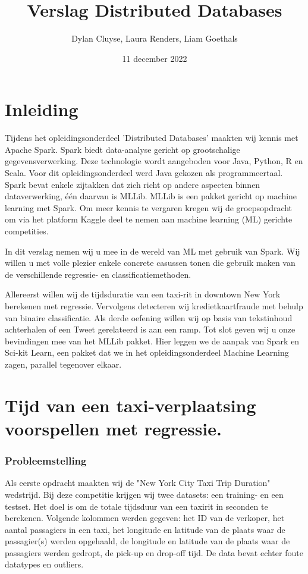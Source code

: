 \documentclass[a4paper,10pt,twoside]{report}
\title{Verslag Distributed Databases}
\author{Dylan {Cluyse}, Laura {Renders}, Liam {Goethals}}
\date{11 december 2022}
\begin{document}
\maketitle

\tableofcontents

\chapter{Inleiding}

Tijdens het opleidingsonderdeel 'Distributed Databases' maakten wij kennis met Apache Spark. Spark biedt data-analyse gericht op grootschalige gegevensverwerking. Deze technologie wordt aangeboden voor Java, Python, R en Scala. Voor dit opleidingsonderdeel werd Java gekozen als programmeertaal. Spark bevat enkele zijtakken dat zich richt op andere aspecten binnen dataverwerking, één daarvan is MLLib. MLLib is een pakket gericht op machine learning met Spark. Om meer kennis te vergaren kregen wij de groepsopdracht om via het platform Kaggle deel te nemen aan machine learning (ML) gerichte competities.

In dit verslag nemen wij u mee in de wereld van ML met gebruik van Spark. Wij willen u met volle plezier enkele concrete casussen tonen die gebruik maken van de verschillende regressie- en classificatiemethoden.

Allereerst willen wij de tijdsduratie van een taxi-rit in downtown New York berekenen met regressie. Vervolgens detecteren wij kredietkaartfraude met behulp van binaire classificatie. Als derde oefening willen wij op basis van tekstinhoud achterhalen of een Tweet gerelateerd is aan een ramp. Tot slot geven wij u onze bevindingen mee van het MLLib pakket. Hier leggen we de aanpak van Spark en Sci-kit Learn, een pakket dat we in het opleidingsonderdeel Machine Learning zagen, parallel tegenover elkaar.

\chapter{Tijd van een taxi-verplaatsing voorspellen met regressie.}

\subsection*{Probleemstelling}

Als eerste opdracht maakten wij de "New York City Taxi Trip Duration" wedstrijd. Bij deze competitie krijgen wij twee datasets: een training- en een testset. Het doel is om de totale tijdsduur van een taxirit in seconden te berekenen. Volgende kolommen werden gegeven: het ID van de verkoper, het aantal passagiers in een taxi, het longitude en latitude van de plaats waar de passagier(s) werden opgehaald, de longitude en latitude van de plaats waar de passagiers werden gedropt, de pick-up en drop-off tijd. De data bevat echter foute datatypes en outliers.
\end{document}
